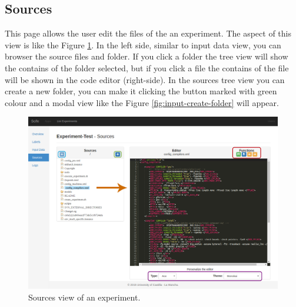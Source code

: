 \documentclass[11pt]{article}
\begin{document}
\subsection{Sources}\label{sec:sources}
This page allows the user edit the files of the an experiment. The aspect of this view is like the Figure \ref{fig:sources}. In the left side, similar to input data view, you can browser the source files and folder. If you click a folder the tree view will show the contains of the folder selected, but if you click a file the contains of the file will be shown in the code editor (right-side). In the sources tree view you can create a new folder, you can make it clicking the button marked with green colour and a modal view like the Figure \ref{fig:input-create-folder} will appear.\\
\begin{figure}[htp]
	\centering
	\includegraphics[width=\linewidth]{img/sources}
	\caption{Sources view of an experiment.}
	\label{fig:sources}
\end{figure}
\end{document}
